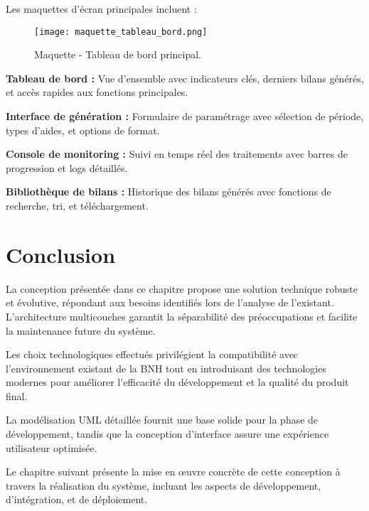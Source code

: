 Les maquettes d'écran principales incluent :

\begin{figure}[hbt!]
    \centering
    \texttt{[image: maquette\_tableau\_bord.png]}
    \caption{Maquette - Tableau de bord principal.}
    \label{fig:maquette-tableau-bord}
\end{figure}

\textbf{Tableau de bord :} Vue d'ensemble avec indicateurs clés, derniers bilans générés, et accès rapides aux fonctions principales.

\textbf{Interface de génération :} Formulaire de paramétrage avec sélection de période, types d'aides, et options de format.

\textbf{Console de monitoring :} Suivi en temps réel des traitements avec barres de progression et logs détaillés.

\textbf{Bibliothèque de bilans :} Historique des bilans générés avec fonctions de recherche, tri, et téléchargement.

\section{Conclusion}

La conception présentée dans ce chapitre propose une solution technique robuste et évolutive, répondant aux besoins identifiés lors de l'analyse de l'existant. L'architecture multicouches garantit la séparabilité des préoccupations et facilite la maintenance future du système.

\medskip

Les choix technologiques effectués privilégient la compatibilité avec l'environnement existant de la BNH tout en introduisant des technologies modernes pour améliorer l'efficacité du développement et la qualité du produit final.

\medskip

La modélisation UML détaillée fournit une base solide pour la phase de développement, tandis que la conception d'interface assure une expérience utilisateur optimisée.

\medskip

Le chapitre suivant présente la mise en œuvre concrète de cette conception à travers la réalisation du système, incluant les aspects de développement, d'intégration, et de déploiement.